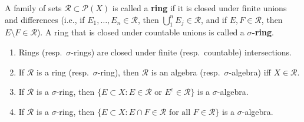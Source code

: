 	\begin{exercise}[Folland 1.1]
		A family of sets $\mathcal{R} \subset \mathcal{P}(X)$ is called a \textbf{ring} if it is closed under finite unions and differences (i.e., if $E_1, \dots, E_n \in \mathcal{R}$, then $\bigcup_1^n E_j \in \mathcal{R}$, and if $E, F \in \mathcal{R}$, then $E \setminus F \in \mathcal{R}$). A ring that is closed under countable unions is called a \textbf{$\sigma$-ring}.
		\begin{enumerate}[label=\textbf{\alph*.}]
			\item Rings (resp.\ $\sigma$-rings) are closed under finite (resp.\ countable) intersections.
			\item If $\mathcal{R}$ is a ring (resp.\ $\sigma$-ring), then $\mathcal{R}$ is an algebra (resp.\ $\sigma$-algebra) iff $X \in \mathcal{R}$.
			\item If $\mathcal{R}$ is a $\sigma$-ring, then $\{E \subset X : E \in \mathcal{R} \text{ or } E^c \in \mathcal{R}\}$ is a $\sigma$-algebra.
			\item If $\mathcal{R}$ is a $\sigma$-ring, then $\{E \subset X : E \cap F \in \mathcal{R} \text{ for all } F \in \mathcal{R}\}$ is a $\sigma$-algebra.
		\end{enumerate}
	\end{exercise}
